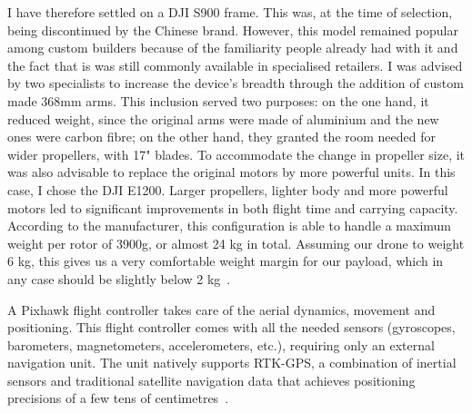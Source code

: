 I have therefore settled on a DJI S900 frame. This was, at the time of
selection, being discontinued by the Chinese brand. However, this model
remained popular among custom builders because of the familiarity people
already had with it and the fact that is was still commonly available in
specialised retailers. I was advised by two specialists to increase the
device's breadth through the addition of custom made 368mm arms. This
inclusion served two purposes: on the one hand, it reduced weight, since
the original arms were made of aluminium and the new ones were carbon
fibre; on the other hand, they granted the room needed for wider
propellers, with 17" blades. To accommodate the change in propeller
size, it was also advisable to replace the original motors by more
powerful units. In this case, I chose the DJI E1200. Larger propellers,
lighter body and more powerful motors led to significant improvements in
both flight time and carrying capacity. According to the manufacturer,
this configuration is able to handle a maximum weight per rotor of
3900g, or almost 24 kg in total. Assuming our drone to weight 6 kg, this
gives us a very comfortable weight margin for our payload, which in any
case should be slightly below 2 kg~\cite{DJI2015}.

A Pixhawk flight controller takes care of the aerial dynamics, movement
and positioning. This flight controller comes with all the needed
sensors (gyroscopes, barometers, magnetometers, accelerometers, etc.),
requiring only an external navigation unit. The unit natively supports
\gls{RTK-GPS}, a combination of inertial sensors and traditional
satellite navigation data that achieves positioning precisions of a few
tens of centimetres~\cite{Zimmermann2017, Triantafyllou2011}.

